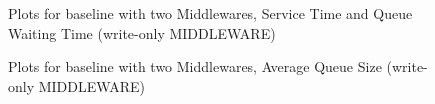 \documentclass[11pt,a4paper]{article}
\begin{document}
\begin{figure}[!h]
  \centering
  \caption{Plots for baseline with two Middlewares, Service Time and Queue Waiting Time (write-only MIDDLEWARE)}
  \label{fig:baseline_mw_2_mw_mw_c_wo}
\end{figure}

\begin{figure}[!h]
  \centering
    \caption{Plots for baseline with two Middlewares, Average Queue Size (write-only MIDDLEWARE)}
  \label{fig:baseline_mw_2_mw_mw_qs_wo}
\end{figure}
\end{document}
